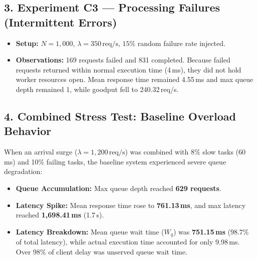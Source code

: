 \documentclass[11pt]{article}
\begin{document}
\subsection*{3. Experiment C3 --- Processing Failures (Intermittent Errors)}
\begin{itemize}[itemsep=0.1em]
    \item \textbf{Setup:} $N = 1,000$, $\lambda = 350\,\text{req/s}$, $15\%$ random failure rate injected.
    \item \textbf{Observations:} 169 requests failed and 831 completed. Because failed requests returned within normal execution time (4\,ms), they did not hold worker resources open. Mean response time remained 4.55\,ms and max queue depth remained 1, while goodput fell to 240.32\,req/s.
\end{itemize}

\subsection*{4. Combined Stress Test: Baseline Overload Behavior}
When an arrival surge ($\lambda = 1,200\,\text{req/s}$) was combined with 8\% slow tasks (60\,ms) and 10\% failing tasks, the baseline system experienced severe queue degradation:
\begin{itemize}[itemsep=0.1em]
    \item \textbf{Queue Accumulation:} Max queue depth reached \textbf{629 requests}.
    \item \textbf{Latency Spike:} Mean response time rose to \textbf{761.13\,ms}, and max latency reached \textbf{1,698.41\,ms} (1.7\,s).
    \item \textbf{Latency Breakdown:} Mean queue wait time ($W_q$) was \textbf{751.15\,ms} ($98.7\%$ of total latency), while actual execution time accounted for only 9.98\,ms. Over 98\% of client delay was unserved queue wait time.
\end{itemize}
\end{document}
